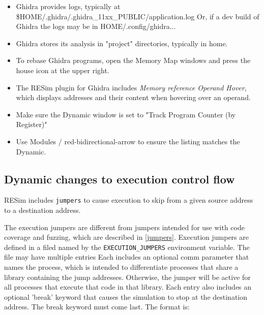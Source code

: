 \documentclass[titlepage]{article}
\begin{document}
\begin{itemize}
\item Ghidra provides logs, typically at \$HOME/.ghidra/.ghidra\_11xx\_PUBLIC/application.log
Or, if a dev build of Ghidra the logs may be in HOME/.config/ghidra...

\item Ghidra stores its analysis in "project" directories, typically in home.

\item To rebase Ghidra programs, open the Memory Map windows and press the house icon at the upper right.

\item The RESim plugin for Ghidra includes \textit{Memory reference Operand Hover}, which displays addresses
and their content when hovering over an operand.

\item Make sure the Dynamic window is set to "Track Program Counter (by Register)"

\item Use Modules / red-bidirectional-arrow to ensure the listing matches the Dynamic.


\end{itemize}

\subsection{Dynamic changes to execution control flow}
\label{dynamic_control_flow}
RESim includes {\tt jumpers} to cause execution to skip from a given source address to a destination address.

The execution jumpers are different from jumpers intended for use with code coverage and fuzzing,
which are described in \ref{jumpers}.
Execution jumpers are defined in a filed named by the {\tt EXECUTION\_JUMPERS} environment variable.
The file may have multiple entries
Each includes an optional comm parameter that names the process,
which is intended to differentiate processes that share a library containing the jump 
addresses. Otherwise, the jumper will be active for all processes that execute that code
in that library. Each entry also includes an optional 'break' keyword that causes the
simulation to stop at the destination address. The break keyword must come last.
The format is:
\end{document}
